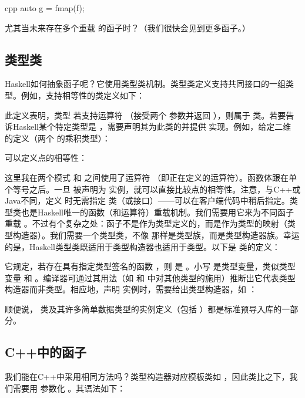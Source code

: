 \begin{snip}{cpp}
auto g = fmap(f);
\end{snip}
尤其当未来存在多个重载  的函子时？（我们很快会见到更多函子。）

\subsection{类型类}

Haskell如何抽象函子呢？它使用类型类机制。类型类定义支持共同接口的一组类型。例如，支持相等性的类定义如下：

此定义表明，类型  若支持运算符 \code{(==)}（接受两个  参数并返回 ），则属于  类。若要告诉Haskell某个特定类型是 ，需要声明其为此类的并提供 \code{(==)} 实现。例如，给定二维  的定义（两个  的乘积类型）：

可以定义点的相等性：

这里我在两个模式  和  之间使用了运算符 \code{(==)}（即正在定义的运算符）。函数体跟在单个等号之后。一旦  被声明为  实例，就可以直接比较点的相等性。注意，与C++或Java不同，定义  时无需指定  类（或接口）——可以在客户端代码中稍后指定。类型类也是Haskell唯一的函数（和运算符）重载机制。我们需要用它来为不同函子重载 。不过有个复杂之处：函子不是作为类型定义的，而是作为类型的映射（类型构造器）。我们需要一个类型类，不像  那样是类型族，而是类型构造器族。幸运的是，Haskell类型类既适用于类型构造器也适用于类型。以下是  类的定义：

它规定，若存在具有指定类型签名的函数 ，则  是 。小写  是类型变量，类似类型变量  和 。编译器可通过其用法（如  和  中对其他类型的施用）推断出它代表类型构造器而非类型。相应地，声明  实例时，需要给出类型构造器，如 ：

顺便说， 类及其许多简单数据类型的实例定义（包括 ）都是标准预导入库的一部分。

\subsection{C++中的函子}

我们能在C++中采用相同方法吗？类型构造器对应模板类如 ，因此类比之下，我们需要用  参数化 。其语法如下：

